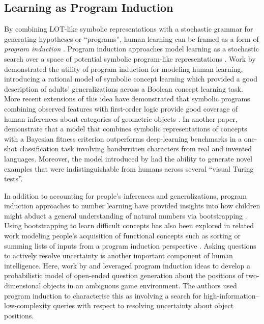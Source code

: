 \documentclass[doc,natbib,floatsintext]{apa7}
\begin{document}
\subsection{Learning as Program Induction}
By combining LOT-like symbolic representations with a stochastic grammar for generating hypotheses or ``programs'', human learning can be framed as a form of \textit{program induction} \citep{chater2013programs, calvo2014architecture, lake2017building,romano2018bayesian, rothe2017question, piantadosi2016logical,bramley2018grounding,rule2018learning}. Program induction approaches model learning as a stochastic search over a space of potential symbolic program-like representations \citep{rule2020child}. Work by \cite{goodman2008rational} demonstrated the utility of program induction for modeling human learning, introducing a rational model of symbolic concept learning which provided a good description of adults' generalizations across a Boolean concept learning task. More recent extensions of this idea have demonstrated that symbolic programs combining observed features with first-order logic provide good coverage of human inferences about categories of geometric objects \citep{piantadosi2016logical}. In another paper, \cite{lake2015human} demonstrate that a model that combines symbolic representations of concepts with a Bayesian fitness criterion outperforms deep-learning benchmarks in a one-shot classification task involving handwritten characters from real and invented languages. Moreover, the model introduced by \cite{lake2015human} had the ability to generate novel examples that were indistinguishable from humans across several ``visual Turing tests''.    

In addition to accounting for people's inferences and generalizations, program induction approaches to number learning have provided insights into how children might abduct a general understanding of natural numbers via bootstrapping \citep{piantadosi2012bootstrapping}. Using bootstrapping to learn difficult concepts has also been explored in related work modeling people's acquisition of functional concepts such as sorting or summing lists of inputs from a program induction perspective \citep{rule2018learning}. Asking questions to actively resolve uncertainty is another important component of human intelligence. Here, work by \cite{rothe2017question} and \cite{wang2019modeling} leveraged program induction ideas to develop a probabilistic model of open-ended question generation about the positions of two-dimensional objects in an ambiguous game environment. The authors used program induction to characterise this as involving a search for high-information--low-complexity queries with respect to resolving uncertainty about object positions.
\end{document}
